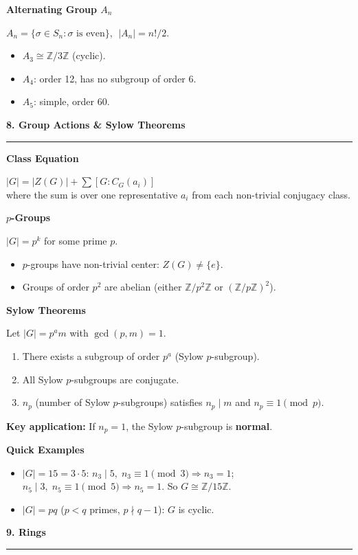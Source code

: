 \documentclass[10pt,twocolumn]{article}
\newcommand{\sect}[1]{\medskip\noindent\textbf{\large #1}\medskip\hrule\smallskip}
\newcommand{\subsect}[1]{\smallskip\noindent\textbf{#1}\par}
\begin{document}
\subsect{Alternating Group $A_n$}
$A_n = \{\sigma\in S_n : \sigma\text{ is even}\}$, $\;|A_n|=n!/2$.
\begin{itemize}[nosep,leftmargin=*]
\item $A_3\cong\mathbb{Z}/3\mathbb{Z}$ (cyclic).
\item $A_4$: order 12, has no subgroup of order 6.
\item $A_5$: simple, order 60.
\end{itemize}

\sect{8. Group Actions \& Sylow Theorems}

\subsect{Class Equation}
$|G| = |Z(G)| + \sum [G:C_G(a_i)]$\\
where the sum is over one representative $a_i$ from each non-trivial conjugacy class.

\subsect{$p$-Groups}
$|G|=p^k$ for some prime $p$.
\begin{itemize}[nosep,leftmargin=*]
\item $p$-groups have non-trivial center: $Z(G)\neq\{e\}$.
\item Groups of order $p^2$ are abelian (either $\mathbb{Z}/p^2\mathbb{Z}$ or $(\mathbb{Z}/p\mathbb{Z})^2$).
\end{itemize}

\subsect{Sylow Theorems}
Let $|G|=p^a m$ with $\gcd(p,m)=1$.
\begin{enumerate}[nosep,leftmargin=*]
\item There exists a subgroup of order $p^a$ (Sylow $p$-subgroup).
\item All Sylow $p$-subgroups are conjugate.
\item $n_p$ (number of Sylow $p$-subgroups) satisfies $n_p\mid m$ and $n_p\equiv 1\pmod{p}$.
\end{enumerate}
\textbf{Key application:} If $n_p=1$, the Sylow $p$-subgroup is \textbf{normal}.

\subsect{Quick Examples}
\begin{itemize}[nosep,leftmargin=*]
\item $|G|=15=3\cdot 5$: $n_3\mid 5,\; n_3\equiv 1\pmod{3}\Rightarrow n_3=1$; $n_5\mid 3,\; n_5\equiv 1\pmod{5}\Rightarrow n_5=1$. So $G\cong\mathbb{Z}/15\mathbb{Z}$.
\item $|G|=pq$ ($p<q$ primes, $p\nmid q-1$): $G$ is cyclic.
\end{itemize}

\sect{9. Rings}
\end{document}
